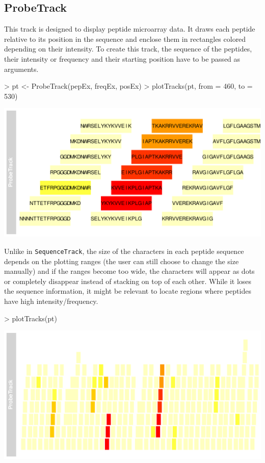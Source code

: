 \documentclass[11pt]{article}
\begin{document}
\subsection{ProbeTrack}
This track is designed to display peptide microarray data. It draws each peptide
relative to its position in the sequence and enclose them in rectangles colored
depending on their intensity.
To create this track, the sequence of the peptides, their intensity or
frequency and their starting position have to be passed as arguments.
\begin{Schunk}
\begin{Sinput}
> pt <- ProbeTrack(pepEx, freqEx, posEx)
> plotTracks(pt, from = 460, to = 530)
\end{Sinput}
\end{Schunk}
\includegraphics{Pviz-ProbeTrack-basic}

Unlike in \texttt{SequenceTrack}, the size of the characters in each peptide
sequence depends on the plotting ranges (the user can still choose to change the
size manually) and if the ranges become too wide, the characters will appear as
dots or completely disappear instead of stacking on top of each other.
While it loses the sequence information, it might be relevant to locate regions
where peptides have high intensity/frequency.
\begin{Schunk}
\begin{Sinput}
> plotTracks(pt)
\end{Sinput}
\end{Schunk}
\includegraphics{Pviz-ProbeTrack-wide-ranges}
\end{document}
